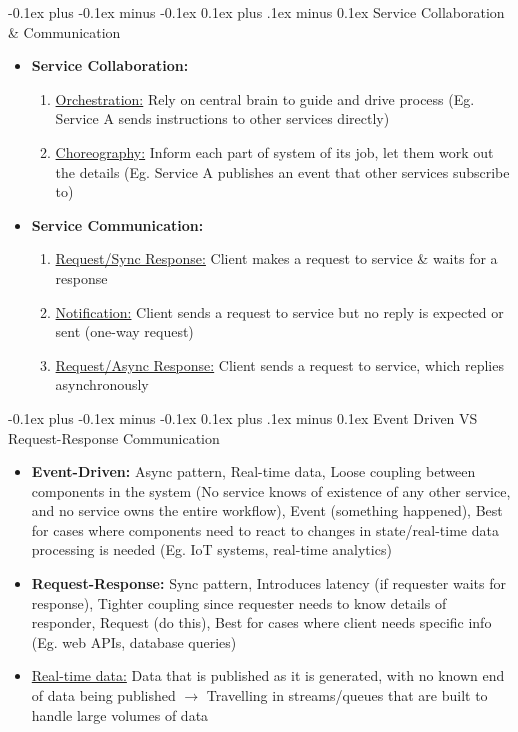 \documentclass[landscape]{article}
\makeatletter
\renewcommand{\subsection}{\@startsection{subsection}{2}{0mm}%
  {-0.1ex plus -0.1ex minus -0.1ex}%
  {0.1ex plus .1ex minus 0.1ex}%
{\normalfont\scriptsize\bfseries}}
\makeatother
\begin{document}
\begin{multicols*}{5}
    \subsection{Service Collaboration \& Communication}
    \begin{itemize}
      \item \textbf{Service Collaboration:}
      \begin{enumerate}
        \item \underline{Orchestration:} Rely on central brain to guide and drive process (Eg. Service A sends instructions to other services directly)
        \item \underline{Choreography:} Inform each part of system of its job, let them work out the details (Eg. Service A publishes an event that other services subscribe to)
      \end{enumerate} 
      \item \textbf{Service Communication:}
      \begin{enumerate}
        \item \underline{Request/Sync Response:} Client makes a request to service \& waits for a response
        \item \underline{Notification:} Client sends a request to service but no reply is expected or sent (one-way request)
        \item \underline{Request/Async Response:} Client sends a request to service, which replies asynchronously
      \end{enumerate}
    \end{itemize}

    \subsection{Event Driven VS Request-Response Communication}
    \begin{itemize}
      \item \textbf{Event-Driven:} Async pattern, Real-time data, Loose coupling between components in the system (No service knows of existence of any other service, and no service owns the entire workflow), Event (something happened), Best for cases where components need to react to changes in state/real-time data processing is needed (Eg. IoT systems, real-time analytics)
      \item \textbf{Request-Response:} Sync pattern, Introduces latency (if requester waits for response), Tighter coupling since requester needs to know details of responder, Request (do this), Best for cases where client needs specific info (Eg. web APIs, database queries)
      \item \underline{Real-time data:} Data that is published as it is generated, with no known end of data being published $\rightarrow$ Travelling in streams/queues that are built to handle large volumes of data
    \end{itemize}


\end{multicols*}
\end{document}
